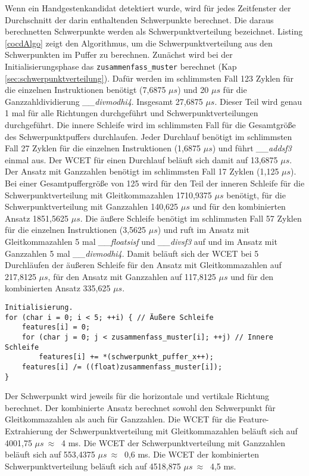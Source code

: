 Wenn ein Handgestenkandidat detektiert wurde, wird für jedes Zeitfenster der Durchschnitt der darin enthaltenden Schwerpunkte berechnet. Die daraus berechnetten Schwerpunkte werden als Schwerpunktverteilung bezeichnet.
Listing \ref{cocdAlgo} zeigt den Algorithmus, um die Schwerpunktverteilung aus den Schwerpunkten im Puffer zu berechnen. Zunächst wird bei der Initialisierungsphase das \texttt{zusammenfass\_muster} berechnet
(Kap \ref{sec:schwerpunktverteilung}). Dafür werden im schlimmsten Fall 123 Zyklen für die einzelnen Instruktionen benötigt (7,6875 $\mu s$) und 20 $\mu s$ für die Ganzzahldividierung \textit{\_\_divmodhi4}. Insgesamt
27,6875 $\mu s$. Dieser Teil wird genau 1 mal für alle Richtungen durchgeführt und Schwerpunktverteilungen durchgeführt. Die innere Schleife wird im schlimmsten Fall für die Gesamtgröße des Schwerpunktpuffers durchlaufen.
Jeder Durchlauf benötigt im schlimmsten Fall 27 Zyklen für die einzelnen Instruktionen (1,6875 $\mu s$) und führt \textit{\_\_addsf3} einmal aus. Der WCET für einen Durchlauf beläuft sich damit auf 13,6875 $\mu s$.
Der Ansatz mit Ganzzahlen benötigt im schlimmsten Fall 17 Zyklen (1,125 $\mu s$). Bei einer Gesamtpuffergröße von 125 wird für den Teil der inneren Schleife für die Schwerpunktverteilung mit Gleitkommazahlen
1710,9375 $\mu s$ benötigt, für die Schwerpunktverteilung mit Ganzzahlen 140,625 $\mu s$ und für den kombinierten Ansatz 1851,5625 $\mu s$. Die äußere Schleife benötigt im schlimmsten Fall 57 Zyklen für die einzelnen
Instruktionen (3,5625 $\mu s$) und ruft im Ansatz mit Gleitkommazahlen 5 mal \textit{\_\_floatsisf} und \textit{\_\_divsf3} auf und im Ansatz mit Ganzzahlen 5 mal \textit{\_\_divmodhi4}. Damit beläuft sich der WCET
bei 5 Durchläufen der äußeren Schleife für den Ansatz mit Gleitkommazahlen auf 217,8125 $\mu s$, für den Ansatz mit Ganzzahlen auf 117,8125 $\mu s$ und für den kombinierten Ansatz 335,625 $\mu s$.
\begin{lstlisting}[label=lst:cocdAlgo,caption={Algorithmus um die Schwerpunktverteilung in horizontaler Richtung zu berechnen.}]
Initialisierung.
for (char i = 0; i < 5; ++i) { // Äußere Schleife
    features[i] = 0;
    for (char j = 0; j < zusammenfass_muster[i]; ++j) // Innere Schleife
        features[i] += *(schwerpunkt_puffer_x++);
    features[i] /= ((float)zusammenfass_muster[i]);
}
\end{lstlisting}
Der Schwerpunkt wird jeweils für die horizontale und vertikale Richtung berechnet. Der kombinierte Ansatz berechnet sowohl den Schwerpunkt für Gleitkommazahlen als auch für Ganzzahlen. Die WCET für die Feature-Extrahierung
der Schwerpunktverteilung mit Gleitkommazahlen beläuft sich auf 4001,75 $\mu s\ \approx\ $ 4 ms. Die WCET der Schwerpunktverteilung mit Ganzzahlen beläuft sich auf 553,4375 $\mu s\ \approx\ $ 0,6 ms. Die WCET der kombinierten
Schwerpunktverteilung beläuft sich auf 4518,875 $\mu s\ \approx\ $ 4,5 ms.
